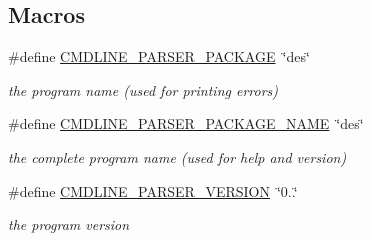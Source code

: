 \subsection*{Macros}
\begin{DoxyCompactItemize}
\item 
\mbox{\label{des-getopt_8h_aeb847973552c32bcbe5f14973a0a8a32}} 
\#define \hyperlink{des-getopt_8h_aeb847973552c32bcbe5f14973a0a8a32}{C\+M\+D\+L\+I\+N\+E\+\_\+\+P\+A\+R\+S\+E\+R\+\_\+\+P\+A\+C\+K\+A\+GE}~\char`\"{}des\char`\"{}
\begin{DoxyCompactList}\small\item\em the program name (used for printing errors) \end{DoxyCompactList}\item 
\mbox{\label{des-getopt_8h_ae2f94765d0d8758ddf6b326a4806d6ff}} 
\#define \hyperlink{des-getopt_8h_ae2f94765d0d8758ddf6b326a4806d6ff}{C\+M\+D\+L\+I\+N\+E\+\_\+\+P\+A\+R\+S\+E\+R\+\_\+\+P\+A\+C\+K\+A\+G\+E\+\_\+\+N\+A\+ME}~\char`\"{}des\char`\"{}
\begin{DoxyCompactList}\small\item\em the complete program name (used for help and version) \end{DoxyCompactList}\item 
\mbox{\label{des-getopt_8h_a1eeca7dc254bf6867ba9635f45771471}} 
\#define \hyperlink{des-getopt_8h_a1eeca7dc254bf6867ba9635f45771471}{C\+M\+D\+L\+I\+N\+E\+\_\+\+P\+A\+R\+S\+E\+R\+\_\+\+V\+E\+R\+S\+I\+ON}~\char`\"{}0..\char`\"{}
\begin{DoxyCompactList}\small\item\em the program version \end{DoxyCompactList}\end{DoxyCompactItemize}
